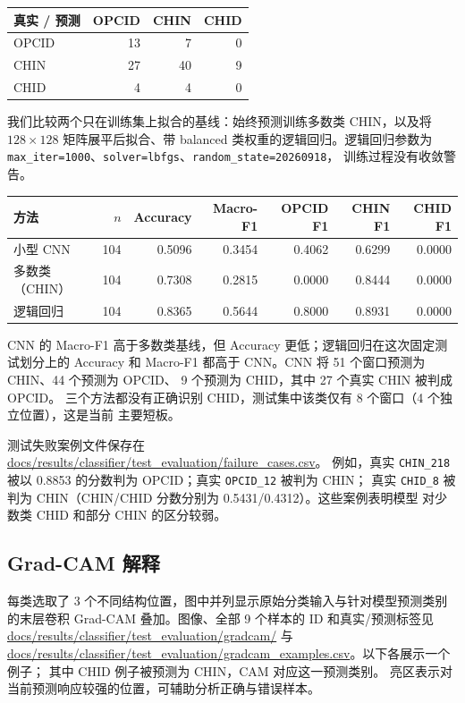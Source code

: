 \begin{center}
\small
\begin{tabular}{lrrr}
\toprule
真实 / 预测 & OPCID & CHIN & CHID \\
\midrule
OPCID & 13 & 7 & 0 \\
CHIN & 27 & 40 & 9 \\
CHID & 4 & 4 & 0 \\
\bottomrule
\end{tabular}
\end{center}

我们比较两个只在训练集上拟合的基线：始终预测训练多数类 CHIN，以及将 $128\times128$
矩阵展平后拟合、带 balanced 类权重的逻辑回归。逻辑回归参数为
\texttt{max\_iter=1000}、\texttt{solver=lbfgs}、\texttt{random\_state=20260918}，
训练过程没有收敛警告。

\begin{center}
\small
\begin{tabular}{lrrrrrr}
\toprule
方法 & $n$ & Accuracy & Macro-F1 & OPCID F1 & CHIN F1 & CHID F1 \\
\midrule
小型 CNN & 104 & 0.5096 & 0.3454 & 0.4062 & 0.6299 & 0.0000 \\
多数类（CHIN） & 104 & 0.7308 & 0.2815 & 0.0000 & 0.8444 & 0.0000 \\
逻辑回归 & 104 & 0.8365 & 0.5644 & 0.8000 & 0.8931 & 0.0000 \\
\bottomrule
\end{tabular}
\end{center}

CNN 的 Macro-F1 高于多数类基线，但 Accuracy 更低；逻辑回归在这次固定测试划分上的
Accuracy 和 Macro-F1 都高于 CNN。CNN 将 51 个窗口预测为 CHIN、44 个预测为 OPCID、
9 个预测为 CHID，其中 27 个真实 CHIN 被判成 OPCID。
三个方法都没有正确识别 CHID，测试集中该类仅有 8 个窗口（4 个独立位置），这是当前
主要短板。

测试失败案例文件保存在 \url{docs/results/classifier/test_evaluation/failure_cases.csv}。
例如，真实 \texttt{CHIN\_218} 被以 0.8853 的分数判为 OPCID；真实 \texttt{OPCID\_12} 被判为 CHIN；
真实 \texttt{CHID\_8} 被判为 CHIN（CHIN/CHID 分数分别为 0.5431/0.4312）。这些案例表明模型
对少数类 CHID 和部分 CHIN 的区分较弱。

\subsection{Grad-CAM 解释}
每类选取了 3 个不同结构位置，图中并列显示原始分类输入与针对模型预测类别的末层卷积
Grad-CAM 叠加。图像、全部 9 个样本的 ID 和真实/预测标签见
\url{docs/results/classifier/test_evaluation/gradcam/} 与
\url{docs/results/classifier/test_evaluation/gradcam_examples.csv}。以下各展示一个例子；
其中 CHID 例子被预测为 CHIN，CAM 对应这一预测类别。
亮区表示对当前预测响应较强的位置，可辅助分析正确与错误样本。

